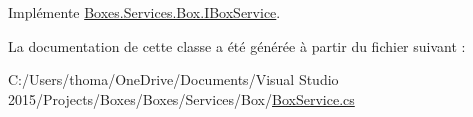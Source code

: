Implémente \hyperlink{interface_boxes_1_1_services_1_1_box_1_1_i_box_service_ae96c252d960cb8f981c766350e950472}{Boxes.\+Services.\+Box.\+I\+Box\+Service}.



La documentation de cette classe a été générée à partir du fichier suivant \+:\begin{DoxyCompactItemize}
\item 
C\+:/\+Users/thoma/\+One\+Drive/\+Documents/\+Visual Studio 2015/\+Projects/\+Boxes/\+Boxes/\+Services/\+Box/\hyperlink{_box_service_8cs}{Box\+Service.\+cs}\end{DoxyCompactItemize}
